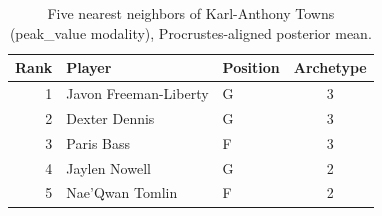 \begin{table}[htbp]
  \centering\small
  \begin{tabular}{rllc}
    \toprule
    Rank & Player & Position & Archetype \\
    \midrule
    1 & Javon Freeman-Liberty & G & 3 \\
    2 & Dexter Dennis & G & 3 \\
    3 & Paris Bass & F & 3 \\
    4 & Jaylen Nowell & G & 2 \\
    5 & Nae'Qwan Tomlin & F & 2 \\
    \bottomrule
  \end{tabular}
  \caption{Five nearest neighbors of Karl-Anthony Towns (peak_value modality), Procrustes-aligned posterior mean.}
  \label{tab:Karl_Anthony_Towns_neighbors_peak_value}
\end{table}

